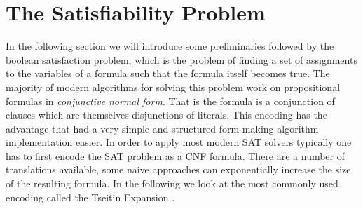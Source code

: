 \section{The Satisfiability Problem}
In the following section we will introduce some preliminaries followed by the boolean satisfaction problem, which is the problem of finding a set of assignments to the variables of a formula such that the formula itself becomes true. The majority of modern algorithms for solving this problem work on propositional formulas in \emph{conjunctive normal form}. That is the formula is a conjunction of clauses which are themselves disjunctions of literals. This encoding has the advantage that had a very simple and structured form making algorithm implementation easier. In order to apply most modern SAT solvers typically one has to first encode the SAT problem as a CNF formula. There are a number of translations available, some naive approaches can exponentially increase the size of the resulting formula. In the following we look at the most commonly used encoding called the Tseitin Expansion \cite{GT83}.
\medskip
